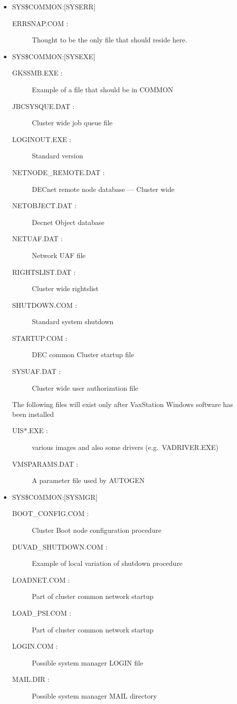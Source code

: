\begin{itemize}
\item {SYS\$COMMON:[SYSERR]}
\begin{description}
\item [ERRSNAP.COM : ] Thought to be the only file that should reside here.
\end{description}
\item {SYS\$COMMON:[SYSEXE]}
\begin{description}
\item [GKSSMB.EXE : ] Example of a file that should be in COMMON
\item [JBCSYSQUE.DAT : ] Cluster wide job queue file
\item [LOGINOUT.EXE : ] Standard version
\item [NETNODE\_REMOTE.DAT : ] DECnet remote node database --- Cluster wide
\item [NETOBJECT.DAT : ] Decnet Object database
\item [NETUAF.DAT : ] Network UAF file
\item [RIGHTSLIST.DAT : ] Cluster wide rightslist
\item [SHUTDOWN.COM : ] Standard system shutdown
\item [STARTUP.COM : ] DEC common Cluster startup file
\item [SYSUAF.DAT : ] Cluster wide user authorization file
\end{description}
The following files will exist only after VaxStation Windows software has been
installed
\begin{description}
\item [UIS*.EXE : ] various images and also some drivers (e.g.\ VADRIVER.EXE)
\item [VMSPARAMS.DAT : ] A parameter file used by AUTOGEN
\end{description}
\item {SYS\$COMMON:[SYSMGR]}
\begin{description}
\item [BOOT\_CONFIG.COM : ] Cluster Boot node configuration procedure
\item [DUVAD\_SHUTDOWN.COM : ] Example of local variation of shutdown procedure
\item [LOADNET.COM : ] Part of cluster common network startup
\item [LOAD\_PSI.COM : ] Part of cluster common network startup
\item [LOGIN.COM : ] Possible system manager LOGIN file 
\item [MAIL.DIR : ] Possible system manager MAIL directory

\end{description}
\end{itemize}
